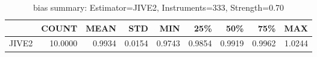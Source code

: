 \begin{table}[ht]
\centering
\caption{bias summary: Estimator=JIVE2, Instruments=333, Strength=0.70}
\begin{tabular}{lrrrrrrrr}
\toprule
 & COUNT & MEAN & STD & MIN & 25\% & 50\% & 75\% & MAX \\
\midrule
JIVE2 & 10.0000 & 0.9934 & 0.0154 & 0.9743 & 0.9854 & 0.9919 & 0.9962 & 1.0244 \\
\bottomrule
\end{tabular}
\end{table}
